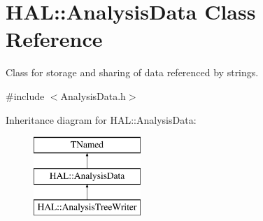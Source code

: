 \hypertarget{class_h_a_l_1_1_analysis_data}{\section{H\+A\+L\+:\+:Analysis\+Data Class Reference}
\label{class_h_a_l_1_1_analysis_data}
}


Class for storage and sharing of data referenced by strings.  




{\ttfamily \#include $<$Analysis\+Data.\+h$>$}

Inheritance diagram for H\+A\+L\+:\+:Analysis\+Data\+:\begin{figure}[H]
\begin{center}
\leavevmode
\includegraphics[height=3.000000cm]{class_h_a_l_1_1_analysis_data}
\end{center}
\end{figure}

